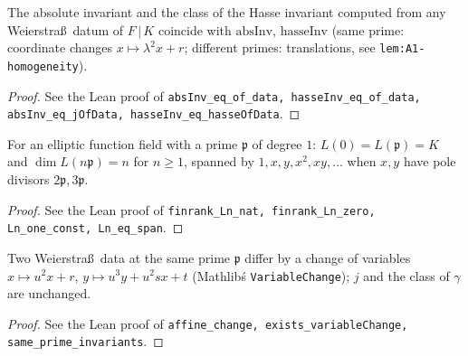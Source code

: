 \begin{lemma}
\label{lem:A1-independence}
\leanok
The absolute invariant and the class of the Hasse invariant computed from any Weierstra\ss\ datum of $F\,|\,K$ coincide with $\mathrm{absInv}$, $\mathrm{hasseInv}$ (same prime: coordinate changes $x\mapsto\lambda^2x+r$; different primes: translations, see \texttt{lem:A1-homogeneity}).
\end{lemma}
\begin{proof}
\leanok
See the Lean proof of \texttt{absInv\_eq\_of\_data, hasseInv\_eq\_of\_data, absInv\_eq\_jOfData, hasseInv\_eq\_hasseOfData}.
\end{proof}

\begin{lemma}[$\dim L(n\mathfrak p)=n$]
\label{lem:rr-dimension}
\leanok
For an elliptic function field with a prime $\mathfrak p$ of degree $1$: $L(0)=L(\mathfrak p)=K$ and $\dim L(n\mathfrak p)=n$ for $n\ge1$, spanned by $1,x,y,x^2,xy,\dots$ when $x,y$ have pole divisors $2\mathfrak p,3\mathfrak p$.
\end{lemma}
\begin{proof}
\leanok
See the Lean proof of \texttt{finrank\_Ln\_nat, finrank\_Ln\_zero, Ln\_one\_const, Ln\_eq\_span}.
\end{proof}

\begin{lemma}
\label{lem:A1-same-prime}
\leanok
Two Weierstra\ss\ data at the same prime $\mathfrak p$ differ by a change of variables $x\mapsto u^2x+r$, $y\mapsto u^3y+u^2sx+t$ (Mathlib\'s \texttt{VariableChange}); $j$ and the class of $\gamma$ are unchanged.
\end{lemma}
\begin{proof}
\leanok
See the Lean proof of \texttt{affine\_change, exists\_variableChange, same\_prime\_invariants}.
\end{proof}

